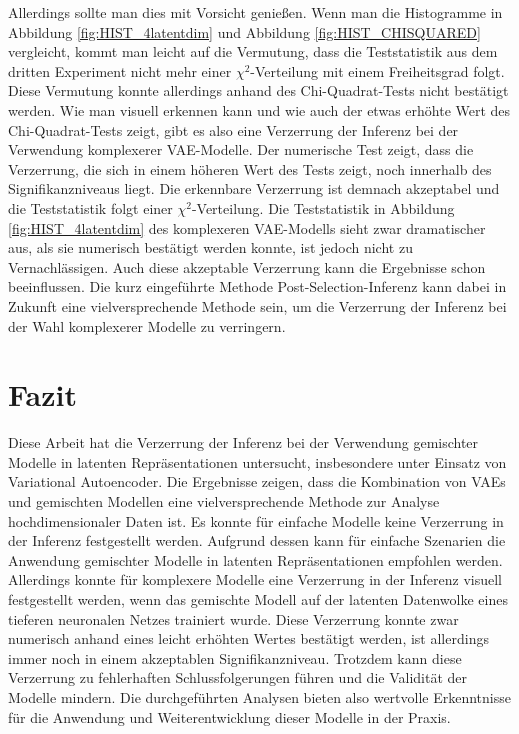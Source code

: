 \documentclass[%
thesis=student,%
coverpage=false,%
titlepage=false,%
headmarks=true, %
german,%
font=libertine, %
math=newpxtx, %
BCOR=5mm,%
coverBCOR=11mm%
]{tumbook}
\theoremstyle{break}
\begin{document}
Allerdings sollte man dies mit Vorsicht genießen. Wenn man die Histogramme in Abbildung \ref{fig:HIST_4latentdim} und Abbildung \ref{fig:HIST_CHISQUARED} vergleicht, kommt man leicht auf die Vermutung, dass die Teststatistik aus dem dritten Experiment nicht mehr einer $\chi^2$-Verteilung mit einem Freiheitsgrad folgt. Diese Vermutung konnte allerdings  anhand des  Chi-Quadrat-Tests nicht bestätigt werden. Wie man visuell erkennen kann und wie auch der etwas erhöhte Wert des Chi-Quadrat-Tests zeigt, gibt es also eine Verzerrung der Inferenz bei der Verwendung komplexerer VAE-Modelle. Der numerische Test zeigt, dass die Verzerrung, die sich in einem höheren Wert des Tests zeigt, noch innerhalb des Signifikanzniveaus liegt. Die erkennbare Verzerrung ist demnach akzeptabel und die Teststatistik folgt einer $\chi^2$-Verteilung. Die Teststatistik in Abbildung \ref{fig:HIST_4latentdim} des komplexeren VAE-Modells sieht zwar dramatischer aus, als sie numerisch bestätigt werden konnte, ist jedoch nicht zu Vernachlässigen. Auch diese akzeptable Verzerrung kann die Ergebnisse schon beeinflussen. Die kurz eingeführte Methode Post-Selection-Inferenz kann dabei in Zukunft eine vielversprechende Methode sein, um die Verzerrung der Inferenz bei der Wahl komplexerer Modelle zu verringern.
\\ 
\chapter{Fazit}
Diese Arbeit hat die Verzerrung der Inferenz bei der Verwendung gemischter Modelle in latenten Repräsentationen untersucht, insbesondere unter Einsatz von Variational Autoencoder. Die Ergebnisse zeigen, dass die Kombination von VAEs und gemischten Modellen eine vielversprechende Methode zur Analyse hochdimensionaler Daten ist. Es konnte für einfache Modelle keine Verzerrung in der Inferenz festgestellt werden. Aufgrund dessen kann für einfache Szenarien die Anwendung gemischter Modelle in latenten Repräsentationen empfohlen werden. Allerdings konnte für komplexere Modelle eine Verzerrung in der Inferenz visuell festgestellt werden, wenn das gemischte Modell auf der latenten Datenwolke eines tieferen neuronalen Netzes trainiert wurde. Diese Verzerrung konnte zwar numerisch anhand eines leicht erhöhten Wertes bestätigt werden, ist allerdings immer noch in einem akzeptablen Signifikanzniveau. Trotzdem kann diese Verzerrung zu fehlerhaften Schlussfolgerungen führen und die Validität der Modelle mindern. Die durchgeführten Analysen bieten also wertvolle Erkenntnisse für die Anwendung und Weiterentwicklung dieser Modelle in der Praxis.\\
\end{document}

